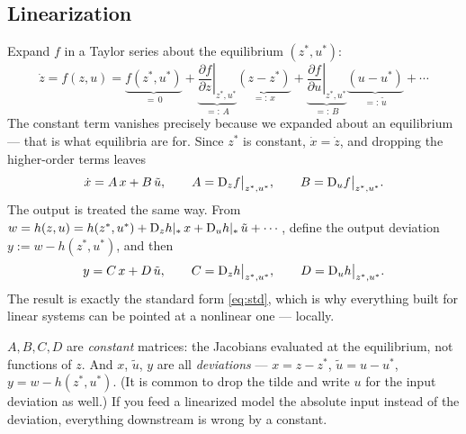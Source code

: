 \documentclass[11pt]{article}
\begin{document}
\subsection{Linearization}\label{sec:lin}
Expand $f$ in a Taylor series about the equilibrium $(z^{*},u^{*})$:
\[
   \dot z = f(z,u)
   = \underbrace{f(z^{*},u^{*})}_{=\,0}
   + \underbrace{\left.\frac{\partial f}{\partial z}\right|_{z^{*},u^{*}}}_{=:\,A}
     \underbrace{(z-z^{*})}_{=:\,x}
   + \underbrace{\left.\frac{\partial f}{\partial u}\right|_{z^{*},u^{*}}}_{=:\,B}
     \underbrace{(u-u^{*})}_{=:\,\tilde u}
   + \cdots
\]
The constant term vanishes precisely because we expanded about an equilibrium ---
that is what equilibria are for. Since $z^{*}$ is constant, $\dot x=\dot z$, and
dropping the higher-order terms leaves
\begin{equation}\label{eq:linAB}
   \dot x = A\,x + B\,\tilde u,\qquad
   A = \mathrm{D}_{z}f\bigl|_{z^{*},u^{*}},\qquad
   B = \mathrm{D}_{u}f\bigl|_{z^{*},u^{*}} .
\end{equation}
The output is treated the same way. From
$w = h(z,u) = h(z^{*},u^{*}) + \mathrm{D}_{z}h|_{*}\,x + \mathrm{D}_{u}h|_{*}\,\tilde u + \cdots$,
define the output deviation $y := w - h(z^{*},u^{*})$, and then
\begin{equation}\label{eq:linCD}
   y = C\,x + D\,\tilde u,\qquad
   C = \mathrm{D}_{z}h\bigl|_{z^{*},u^{*}},\qquad
   D = \mathrm{D}_{u}h\bigl|_{z^{*},u^{*}} .
\end{equation}
The result is exactly the standard form \eqref{eq:std}, which is why everything
built for linear systems can be pointed at a nonlinear one --- locally.

\begin{caution}
$A,B,C,D$ are \emph{constant} matrices: the Jacobians evaluated at the
equilibrium, not functions of $z$. And $x$, $\tilde u$, $y$ are all
\emph{deviations} --- $x=z-z^{*}$, $\tilde u=u-u^{*}$, $y=w-h(z^{*},u^{*})$.
(It is common to drop the tilde and write $u$ for the input deviation as well.)
If you feed a linearized model the absolute input instead of the deviation,
everything downstream is wrong by a constant.
\end{caution}
\end{document}
